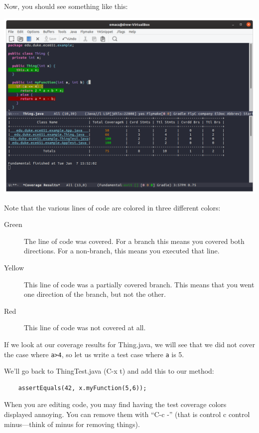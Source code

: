 \documentclass[12pt]{article}
\begin{document}
Now, you should see something like this:

\begin{center}
  \includegraphics[width=5.5in]{emacs-test-cov2.png}
\end{center}

Note that the various lines of code are colored in three different colors:
\begin{description}
\item[Green] The line of code was covered. For a branch this means you
  covered both directions.  For a non-branch, this means you executed
  that line.
\item[Yellow] This line of code was a partially covered branch.  This
  means that you went one direction of the branch, but not the other.
\item[Red] This line of code was not covered at all.
\end{description}


 If we look at our coverage results for Thing.java, we will see that
 we did not cover the case where \verb+a>4+, so let us write a test
 case where \verb+a+ is 5.

 We'll go back to ThingTest.java (C-x t) and add this to our method:

\begin{verbatim}
    assertEquals(42, x.myFunction(5,6)); 
\end{verbatim}

When you are editing code, you may find having the test coverage
colors displayed annoying.  You can remove them with ``C-c -'' (that is
control c control minus---think of minus for removing things).
\end{document}

